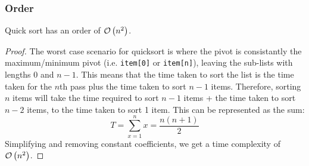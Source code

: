         \subsubsection{Order}
        \begin{theorem}
            Quick sort has an order of $\mathcal{O}\left(n^2\right)$.
        \end{theorem}
        \begin{proof}
            The worst case scenario for quicksort is where the pivot is consistantly the maximum/minimum pivot (i.e. \verb|item[0]| or \verb|item[n]|), leaving the sub-lists with lengths 0 and $n-1$.
            This means that the time taken to sort the list is the time taken for the $n$th pass plus the time taken to sort $n-1$ items.
            Therefore, sorting $n$ items will take the time required to sort $n-1$ items + the time taken to sort $n-2$ items, to the time taken to sort 1 item.
            This can be represented as the sum:
            \begin{equation}
                T=\sum_{x=1}^{n}x=\frac{n(n+1)}{2}
            \end{equation}
            Simplifying and removing constant coefficients, we get a time complexity of $\mathcal{O}\left(n^2\right)$.
            
        \end{proof}


